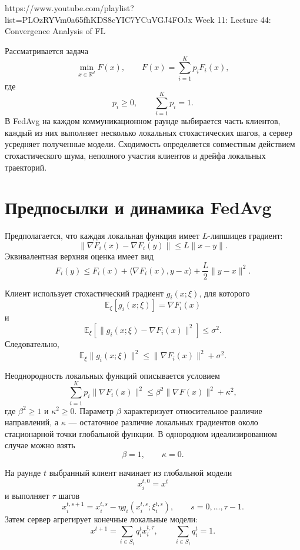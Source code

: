 
\sourcevideo
    {https://www.youtube.com/playlist?list=PLOzRYVm0a65fhKDS8cYIC7YCuVGJ4FOJx}
    {Week 11: Lecture 44: Convergence Analysis of FL}

Рассматривается задача
\[
    \min_{x\in\mathbb R^d}F(x),
    \qquad
    F(x)=\sum_{i=1}^{K}p_iF_i(x),
\]
где
\[
    p_i\ge0,
    \qquad
    \sum_{i=1}^{K}p_i=1.
\]
В FedAvg на каждом коммуникационном раунде выбирается часть клиентов,
каждый из них выполняет несколько локальных стохастических шагов, а
сервер усредняет полученные модели. Сходимость определяется совместным
действием стохастического шума, неполного участия клиентов и дрейфа
локальных траекторий.

\section{Предпосылки и динамика FedAvg}

Предполагается, что каждая локальная функция имеет
\(L\)-липшицев градиент:
\[
    \lVert\nabla F_i(x)-\nabla F_i(y)\rVert
    \le
    L\lVert x-y\rVert.
\]
Эквивалентная верхняя оценка имеет вид
\[
    F_i(y)
    \le
    F_i(x)
    +\langle\nabla F_i(x),y-x\rangle
    +\frac L2\lVert y-x\rVert^2.
\]

Клиент использует стохастический градиент \(g_i(x;\xi)\), для которого
\[
    \mathbb E_\xi[g_i(x;\xi)]
    =
    \nabla F_i(x)
\]
и
\[
    \mathbb E_\xi
    \left[
        \lVert
            g_i(x;\xi)-\nabla F_i(x)
        \rVert^2
    \right]
    \le
    \sigma^2.
\]
Следовательно,
\[
    \mathbb E_\xi\lVert g_i(x;\xi)\rVert^2
    \le
    \lVert\nabla F_i(x)\rVert^2+\sigma^2.
\]

Неоднородность локальных функций описывается условием
\[
    \sum_{i=1}^{K}
    p_i\lVert\nabla F_i(x)\rVert^2
    \le
    \beta^2\lVert\nabla F(x)\rVert^2
    +\kappa^2,
\]
где \(\beta^2\ge1\) и \(\kappa^2\ge0\). Параметр \(\beta\)
характеризует относительное различие направлений, а \(\kappa\) ---
остаточное различие локальных градиентов около стационарной точки
глобальной функции. В однородном идеализированном случае можно взять
\[
    \beta=1,
    \qquad
    \kappa=0.
\]

На раунде \(t\) выбранный клиент начинает из глобальной модели
\[
    x_i^{t,0}=x^t
\]
и выполняет \(\tau\) шагов
\[
    x_i^{t,s+1}
    =
    x_i^{t,s}
    -
    \eta g_i(x_i^{t,s};\xi_i^{t,s}),
    \qquad
    s=0,\ldots,\tau-1.
\]
Затем сервер агрегирует конечные локальные модели:
\[
    x^{t+1}
    =
    \sum_{i\in S_t}q_i^t x_i^{t,\tau},
    \qquad
    \sum_{i\in S_t}q_i^t=1.
\]

